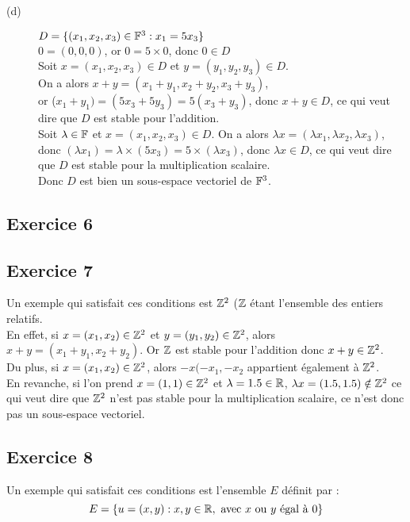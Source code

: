 \documentclass[12pt]{book}
\begin{document}
\begin{description}
    \item[(d)] $D= \{(x_1,x_2,x_3)\in\mathbb{F}^3:x_1=5x_3\} $\\
    $0=(0,0,0)$, or $0=5\times 0$, donc $0\in D$\\
    Soit $x=(x_1,x_2,x_3)\in D$ et $y=(y_1,y_2,y_3)\in D$.\\
    On a alors $x+y=(x_1+y_1,x_2+y_2,x_3+y_3)$, \\
    or ($x_1+y_1)=(5x_3+5y_3)=5(x_3+y_3)$, donc $x+y\in D$, ce qui veut dire que $D$ est stable pour l’addition.\\
    Soit $\lambda \in\mathbb{F}$ et $x=(x_1,x_2,x_3)\in D$.
    On a alors $\lambda x=(\lambda x_1,\lambda x_2, \lambda x_3)$, donc $(\lambda x_1)=\lambda\times (5x_3)=5\times(\lambda x_3)$, donc $\lambda x\in D$, ce qui veut dire que $D$ est stable pour la multiplication scalaire.\\
    Donc $D$ est bien un sous-espace vectoriel de $\mathbb{F}^3$.\\

\end{description}
\subsection*{Exercice 6}


\subsection*{Exercice 7}
Un exemple qui satisfait ces conditions est $\mathbb{Z}^2$ ($\mathbb{Z}$ étant l’ensemble des entiers relatifs.\\
En effet, si $x=(x_1,x_2)\in\mathbb{Z}^2$ et $y=(y_1,y_2)\in\mathbb{Z}^2$, alors $x+y=(x_1+y_1,x_2+y_2)$. Or $\mathbb{Z}$ est stable pour l’addition donc $x+y\in\mathbb{Z}^2$.\\
Du plus, si $x=(x_1,x_2)\in\mathbb{Z}^2$, alors $-x(-x_1,-x_2$ appartient également à $\mathbb{Z}^2$.\\
En revanche, si l’on prend $x=(1,1)\in\mathbb{Z}^2$ et $\lambda=1.5\in\mathbb{R}$, $\lambda x=(1.5,1.5)\notin\mathbb{Z}^2$ ce qui veut dire que $\mathbb{Z}^2$ n’est pas stable pour la multiplication scalaire, ce n’est donc pas un sous-espace vectoriel.

\subsection*{Exercice 8}

Un exemple qui satisfait ces conditions est l’ensemble $E$ définit par :
\begin{equation*}
    E=\{u=(x,y): x,y\in\mathbb{R},\mathrm{~avec~}x\mathrm{~ou~}y\mathrm{~\acute{e}gal~\grave{a}~0}\}
\end{equation*}
\end{document}
